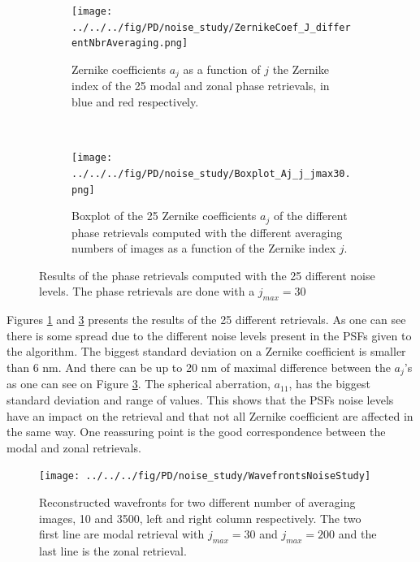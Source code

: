 \begin{figure}
\centering
    \begin{subfigure}{\textwidth}
        \texttt{[image: ../../../fig/PD/noise\_study/ZernikeCoef\_J\_differentNbrAveraging.png]}
        \caption{Zernike coefficients $a_j$ as a function of $j$ the Zernike index of the 25 modal and zonal phase retrievals, in blue and red respectively.}
        \label{subfig:ZernikeCoef_J_differentNbrAveragingjmax30}
    \end{subfigure}
    \\
    \begin{subfigure}{0.75\textwidth}
        \texttt{[image: ../../../fig/PD/noise\_study/Boxplot\_Aj\_j\_jmax30.png]}
        \caption{Boxplot of the 25 Zernike coefficients $a_j$ of the different phase retrievals computed with the different averaging numbers of images as a function of the Zernike index $j$.}
        \label{subfig:Boxplot_Aj_j_jmax30}
    \end{subfigure}
    \decoRule
    \caption{Results of the phase retrievals computed with the 25 different noise levels. The phase retrievals are done with a $j_{max} = 30$}
\end{figure}

Figures \ref{subfig:ZernikeCoef_J_differentNbrAveragingjmax30} and \ref{subfig:Boxplot_Aj_j_jmax30} presents the results of the 25 different retrievals. As one can see there is some spread due to the different noise levels present in the PSFs given to the algorithm. The biggest standard deviation on a Zernike coefficient is smaller than 6 nm. And there can be up to 20 nm of maximal difference between the $a_j$'s as one can see on Figure \ref{subfig:Boxplot_Aj_j_jmax30}. The spherical aberration, $a_{11}$, has the biggest standard deviation and range of values. This shows that the PSFs noise levels have an impact on the retrieval and that not all Zernike coefficient are affected in the same way. One reassuring point is the good correspondence between the modal and zonal retrievals.

\begin{figure}
\begin{center}
\texttt{[image: ../../../fig/PD/noise\_study/WavefrontsNoiseStudy]}
\decoRule
\caption{Reconstructed wavefronts for two different number of averaging images, 10 and 3500, left and right column respectively. The two first line are modal retrieval with $j_{max}=30$ and $j_{max}=200$ and the last line is the zonal retrieval.}
\label{fig:WavefrontsNoiseStudy}
\end{center}
\end{figure}


